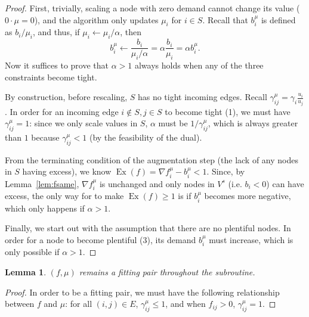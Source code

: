 \documentclass[11pt]{article}
\newtheorem{lemma}[theorem]{Lemma}
\theoremstyle{definition}
\theoremstyle{definition}
\newcommand{\fu}{f^{\mu}}
\newcommand{\nfiu}{\nabla \fu_i}
\newcommand{\biu}{b_{i}^{\mu}}
\newcommand{\giij}{\gamma_{ij}^{\mu}}
\newcommand{\vsrc}{V^{s}}
\newcommand{\fp}{(f,\mu)}
\DeclareMathOperator{\Ex}{Ex}
\newcommand{\todo}[1]{}%
\begin{document}
    \begin{proof}
        First, trivially, scaling a node with zero demand cannot change its value
        ($0\cdot\mu=0$), and the algorithm only updates $\mu_i$ for $i \in S$. Recall
        that $\biu$ is defined as $b_i / \mu_i$, and thus, if $\mu_i\leftarrow \mu_i / \alpha$,
        then
        \[ \biu \leftarrow \frac{b_i}{\mu_i / \alpha} = \alpha\frac{b_i}{\mu_i} = \alpha \biu. \] 
        Now it suffices to prove that $\alpha > 1$ always holds when any of the three
        constraints become tight.

        By construction, before rescaling, $S$ has no tight
        incoming edges. Recall $\giij = \gamma_i\frac{u_i}{u_j}$. In order for an
        incoming edge $i \notin S, j\in S$ to become tight (1), we must have $\giij=1$:
        since we only scale values in $S$, $\alpha$ must be ${1}/{\giij}$, which is
        always greater than $1$ because $\giij < 1$ (by the feasibility of the dual).

        From the terminating condition of the augmentation step (the lack of any nodes
        in $S$ having excess), we know $\Ex(f) = \nfiu - \biu < 1$. Since, by
        Lemma~\ref{lem:fsame}, $\nfiu$ is unchanged and only nodes in $\vsrc$ (i.e. $b_i<0$)
        can have excess, the only way for to make $\Ex(f) \ge 1$ is if $\biu$ becomes
        more negative, which only happens if $\alpha > 1$. 

        Finally, we start out with the assumption that there are no plentiful nodes.
        In order for a node to become plentiful (3), its demand $\biu$ must increase,
        which is only possible if $\alpha > 1$.
    \end{proof}
    \begin{lemma}
        \label{lem:still-fit}
        $\fp$ remains a fitting pair throughout the subroutine.
    \end{lemma}
    \begin{proof}
        In order to be a fitting pair, we must have the following relationship between
        $f$ and $\mu$: for all $(i, j) \in E$, $\giij \leq 1$, and when $f_{ij} > 0$, 
        $\giij = 1$. \todo{This is a definition, not a proof.}
    \end{proof}
\end{document}
